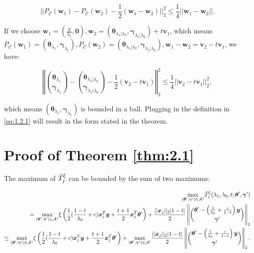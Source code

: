 \begin{equation}
    ||P_{\mathcal{C}}(\boldsymbol w_1)-P_{\mathcal{C}}(\boldsymbol w_2)-\frac{1}{2}(\boldsymbol w_1-\boldsymbol w_2)||_2^2\leq\frac{1}{4}||\boldsymbol w_1-\boldsymbol w_2||.
\end{equation}

If we choose $\boldsymbol w_1=(\frac{y}{\lambda_1},\boldsymbol0),\boldsymbol w_2=(\boldsymbol \theta_{\lambda_1|\lambda_0},\boldsymbol \gamma_{\lambda_1|\lambda_0})+t\boldsymbol v_1$, which means $P_{\mathcal{C}}(\boldsymbol w_1)=(\boldsymbol\theta_{\lambda_1},\boldsymbol\gamma_{\lambda_1}),P_{\mathcal{C}}(\boldsymbol w_2)=(\boldsymbol\theta_{\lambda_1
|\lambda_0},\boldsymbol\gamma_{\lambda_1|\lambda_0}),\boldsymbol w_1-\boldsymbol w_2=\boldsymbol v_2-t\boldsymbol v_1$, we have:

\begin{equation}
    \left\Vert\binom{\boldsymbol\theta_{\lambda_1}}{\boldsymbol\gamma_{\lambda_1}}-\binom{\boldsymbol\theta_{\lambda_1
|\lambda_0}}{\boldsymbol\gamma_{\lambda_1|\lambda_0}}-\frac{1}{2}(\boldsymbol v_2-t\boldsymbol v_1)\right\Vert_2^2\leq\frac{1}{4}||\boldsymbol v_2-t\boldsymbol v_1||_2^2,
\end{equation}

which means $(\boldsymbol\theta_{\lambda_1},\boldsymbol\gamma_{\lambda_1})$ is bounded in a ball. Plugging in the definition in \eqref{eq:1.2.1} will result in the form stated in the theorem.

\section{Proof of Theorem \ref{thm:2.1}}

The maximum of $\Tilde{T}^\xi_j$ can be bounded by the sum of two maximums:

\begin{gather}
    \begin{aligned}
        \underset{(\boldsymbol\theta',\boldsymbol\gamma')\in\mathcal{A}^1}{\mathrm{max}}\Tilde{T}^\xi_j(\lambda_1,\lambda_0,t;\boldsymbol\theta',\boldsymbol\gamma')\\
        =\underset{(\boldsymbol\theta',\boldsymbol\gamma')\in\mathcal{A}^1}{\mathrm{max}}\xi\left( \frac{1}{2}(\frac{1-t}{\lambda_0}+c)\boldsymbol x_j^T\boldsymbol y+\frac{t+1}{2}\boldsymbol x_j^T\boldsymbol\theta'\right)+\frac{||\boldsymbol x_j||_2|1-t|}{2}\left\Vert\binom{\boldsymbol\theta'-\left(\frac{1}{\lambda_0}+\frac{c}{1-t}\right)\boldsymbol y}{\boldsymbol\gamma'}\right\Vert_2\\
        \leq \underset{(\boldsymbol\theta',\boldsymbol\gamma')\in\mathcal{A}^1}{\mathrm{max}}\xi\left( \frac{1}{2}(\frac{1-t}{\lambda_0}+c)\boldsymbol x_j^T\boldsymbol y+\frac{t+1}{2}\boldsymbol x_j^T\boldsymbol\theta'\right)+\underset{(\boldsymbol\theta',\boldsymbol\gamma')\in\mathcal{A}^1}{\mathrm{max}}\frac{||\boldsymbol x_j||_2|1-t|}{2}\left\Vert\binom{\boldsymbol\theta'-\left(\frac{1}{\lambda_0}+\frac{c}{1-t}\right)\boldsymbol y}{\boldsymbol\gamma'}\right\Vert_2.
    \end{aligned}
\end{gather}

